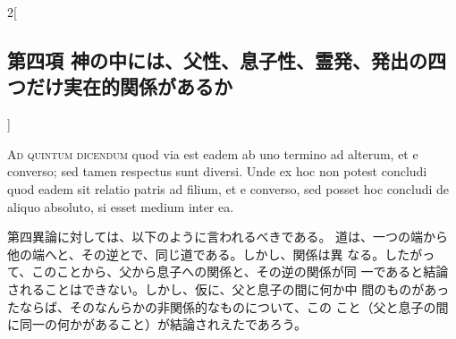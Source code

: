 \documentclass[paper=a4paper,fontsize=10pt,jafontsize=9pt,titlepage]{jlreq}
\begin{document}
\begin{paracol}{2}[\subsection{第四項 神の中には、父性、息子性、霊発、発出の四つだけ実在的関係があるか}]
\switchcolumn*[\subsection{ad.5}]


{\scshape Ad quintum dicendum} quod via est eadem ab uno termino ad alterum, et e
converso; sed tamen respectus sunt diversi. Unde ex hoc non potest
concludi quod eadem sit relatio patris ad filium, et e converso, sed
posset hoc concludi de aliquo absoluto, si esset medium inter ea.


\switchcolumn


第四異論に対しては、以下のように言われるべきである。
道は、一つの端から他の端へと、その逆とで、同じ道である。しかし、関係は異
 なる。したがって、このことから、父から息子への関係と、その逆の関係が同
 一であると結論されることはできない。しかし、仮に、父と息子の間に何か中
 間のものがあったならば、そのなんらかの非関係的なものについて、この
 こと（父と息子の間に同一の何かがあること）が結論されえたであろう。


\switchcolumn*



\end{paracol}
\newpage
\end{document}
